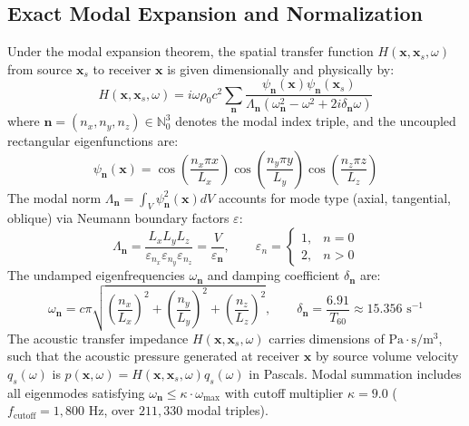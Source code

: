 \documentclass[11pt,a4paper,titlepage]{article}
\begin{document}
\subsection{Exact Modal Expansion and Normalization}
Under the modal expansion theorem, the spatial transfer function $H(\mathbf{x}, \mathbf{x}_s, \omega)$ from source $\mathbf{x}_s$ to receiver $\mathbf{x}$ is given dimensionally and physically by:
\begin{equation}
    H(\mathbf{x}, \mathbf{x}_s, \omega) = i \omega \rho_0 c^2 \sum_{\mathbf{n}} \frac{\psi_{\mathbf{n}}(\mathbf{x}) \psi_{\mathbf{n}}(\mathbf{x}_s)}{\Lambda_{\mathbf{n}} \left( \omega_{\mathbf{n}}^2 - \omega^2 + 2 i \delta_{\mathbf{n}} \omega \right)}
\end{equation}
where $\mathbf{n} = (n_x, n_y, n_z) \in \mathbb{N}_0^3$ denotes the modal index triple, and the uncoupled rectangular eigenfunctions are:
\begin{equation}
    \psi_{\mathbf{n}}(\mathbf{x}) = \cos\left(\frac{n_x \pi x}{L_x}\right) \cos\left(\frac{n_y \pi y}{L_y}\right) \cos\left(\frac{n_z \pi z}{L_z}\right)
\end{equation}
The modal norm $\Lambda_{\mathbf{n}} = \int_V \psi_{\mathbf{n}}^2(\mathbf{x}) dV$ accounts for mode type (axial, tangential, oblique) via Neumann boundary factors $\varepsilon$:
\begin{equation}
    \Lambda_{\mathbf{n}} = \frac{L_x L_y L_z}{\varepsilon_{n_x} \varepsilon_{n_y} \varepsilon_{n_z}} = \frac{V}{\varepsilon_{\mathbf{n}}}, \qquad \varepsilon_n = \begin{cases} 1, & n = 0 \\ 2, & n > 0 \end{cases}
\end{equation}
The undamped eigenfrequencies $\omega_{\mathbf{n}}$ and damping coefficient $\delta_{\mathbf{n}}$ are:
\begin{equation}
    \omega_{\mathbf{n}} = c \pi \sqrt{\left(\frac{n_x}{L_x}\right)^2 + \left(\frac{n_y}{L_y}\right)^2 + \left(\frac{n_z}{L_z}\right)^2}, \qquad \delta_{\mathbf{n}} = \frac{6.91}{T_{60}} \approx 15.356\text{ s}^{-1}
\end{equation}
The acoustic transfer impedance $H(\mathbf{x}, \mathbf{x}_s, \omega)$ carries dimensions of $\text{Pa} \cdot \text{s} / \text{m}^3$, such that the acoustic pressure generated at receiver $\mathbf{x}$ by source volume velocity $q_s(\omega)$ is $p(\mathbf{x}, \omega) = H(\mathbf{x}, \mathbf{x}_s, \omega) q_s(\omega)$ in Pascals. Modal summation includes all eigenmodes satisfying $\omega_{\mathbf{n}} \le \kappa \cdot \omega_{\max}$ with cutoff multiplier $\kappa = 9.0$ ($f_{\text{cutoff}} = 1,800\text{ Hz}$, over $211,330$ modal triples).
\end{document}

